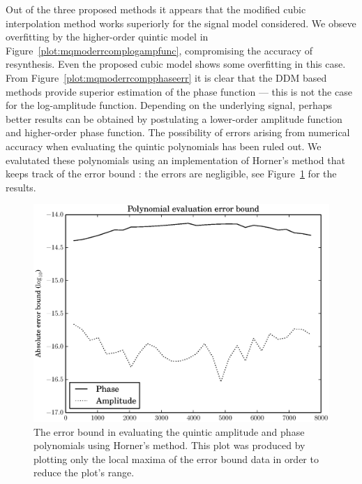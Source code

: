 Out of the three proposed methods it appears that the modified cubic
interpolation method works superiorly for the signal model considered. We obseve
overfitting by the higher-order quintic model in
Figure~\ref{plot:mqmoderrcomplogampfunc}, compromising the accuracy of
resynthesis.  Even the proposed cubic model shows some overfitting in
this case. From Figure~\ref{plot:mqmoderrcompphaseerr} it is clear that the DDM
based methods provide superior estimation of the phase function --- this is not
the case for the log-amplitude function. Depending on the underlying signal,
perhaps better results can be obtained by postulating a lower-order amplitude
function and higher-order phase function. The possibility of errors arising from
numerical accuracy when evaluating the quintic polynomials has been ruled out.
We evalutated these polynomials using an implementation of Horner's method that
keeps track of the error bound \cite[p.~95]{higham2002accuracy}: the errors are
negligible, see Figure~\ref{plot:mqmodquinticpolyevalerr} for the results.

\begin{figure}[!t]
    \centering
    \includegraphics[width=\figwidthscale\textwidth]{plots/mq_mod_quintic_poly_eval_err.eps}
    \caption{The error bound in evaluating the quintic amplitude and phase
    polynomials using Horner's method. This plot was produced by plotting only
    the local maxima of the error bound data in order to reduce the plot's
    range.\label{plot:mqmodquinticpolyevalerr}}
\end{figure}
